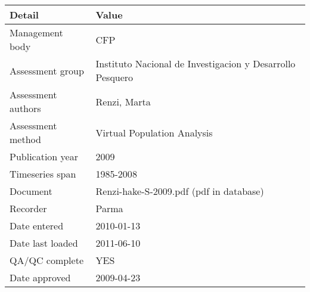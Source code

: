\begin{table}[htb]
\centering
\begin{tabular}{lp{7cm}}
\toprule
Detail & Value \\
\midrule
Management body    & CFP                                                       \\
Assessment group   & Instituto Nacional de Investigacion y Desarrollo Pesquero \\
Assessment authors & Renzi, Marta                                              \\
Assessment method  & Virtual Population Analysis                               \\
Publication year   & 2009                                                      \\
Timeseries span    & 1985-2008                                                 \\
Document           & Renzi-hake-S-2009.pdf (pdf in database)                   \\
Recorder           & Parma                                                     \\
Date entered       & 2010-01-13                                                \\
Date last loaded   & 2011-06-10                                                \\
QA/QC complete     & YES                                                       \\
Date approved      & 2009-04-23                                                \\
\bottomrule
\end{tabular}
\label{tab:assessdet}
\end{table}
